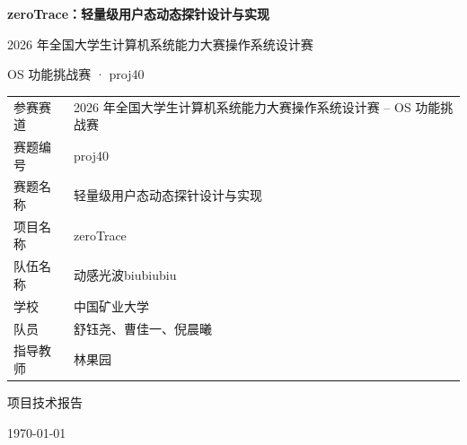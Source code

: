 \documentclass[UTF8,a4paper,11pt,fontset=fandol]{ctexart}
\renewcommand{\arraystretch}{1.22}
\newcommand{\code}[1]{\texttt{#1}}
\begin{document}
\hypersetup{pageanchor=false}

\begin{titlepage}
  \centering
  \vspace*{2.0cm}
  {\bfseries zeroTrace：轻量级用户态动态探针设计与实现\par}
  \vspace{0.8cm}
  {2026 年全国大学生计算机系统能力大赛操作系统设计赛\par}
  \vspace{0.2cm}
  {OS 功能挑战赛 · proj40\par}
  \vspace{1.8cm}

  \renewcommand{\arraystretch}{1.35}
  \begin{tabular}{P{3.5cm}P{9.2cm}}
    \toprule
    参赛赛道 & 2026 年全国大学生计算机系统能力大赛操作系统设计赛 -- OS 功能挑战赛 \\
    赛题编号 & proj40 \\
    赛题名称 & 轻量级用户态动态探针设计与实现 \\
    项目名称 & zeroTrace \\
    队伍名称 & 动感光波biubiubiu \\
    学校 & 中国矿业大学 \\
    队员 & 舒钰尧、曹佳一、倪晨曦 \\
    指导教师 & 林果园 \\
    \bottomrule
  \end{tabular}

  \vfill
  {\large 项目技术报告\par}
  \vspace{0.2cm}
  {\large \today\par}
\end{titlepage}

\hypersetup{pageanchor=true}
\tableofcontents
\newpage

\begin{abstract}
zeroTrace 是一套面向 Linux 用户态程序的轻量级动态探针系统。传统 uprobe 在命中用户态函数时通常要切到内核侧处理事件，高频函数上的上下文切换会明显放大观测成本。zeroTrace 把安装阶段和命中阶段分开：tracer 进程负责安装、更新和清理 probe；函数命中后的快速路径留在目标进程用户态内部，由入口 patch、trampoline、payload stub 和共享 trace buffer 完成参数采集、返回值捕获和事件输出。

系统支持动态库函数追踪、前 6 个参数捕获、return probe、多 probe 共存、动态开关、线程组级 patch 安全、条件过滤、探针热更新和探针内调用目标进程函数，并提供 x86\_64 与 aarch64 两套 ISA 后端。日志沿用 perf/ftrace 风格字段，记录 comm、pid/tid、CPU、\code{CLOCK\_MONOTONIC} 时间戳和事件类型，便于和系统级 trace 事件放到同一条时间线上分析。本次 x86\_64 评测中，zeroTrace 单次 probe 额外开销均值为 174.45 ns，比 kernel uprobe 低 11.08 倍；probe 安装延迟均值为 0.371 ms，卸载延迟均值为 0.084 ms，均低于赛题指标要求。

\noindent\textbf{关键词：}用户态动态探针；ptrace；trampoline；return probe；trace buffer；多线程安全；热更新
\end{abstract}
\end{document}
